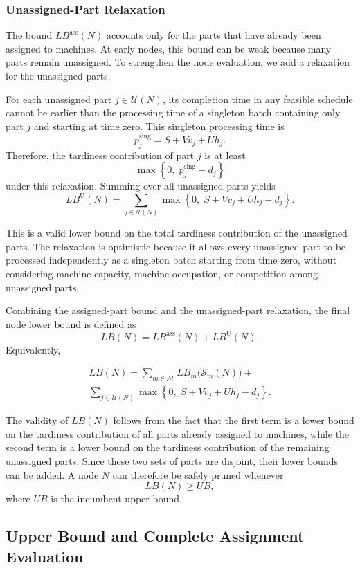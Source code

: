 \documentclass[letterpaper, 10 pt, conference]{ieeeconf}  %
\begin{document}
\subsubsection{Unassigned-Part Relaxation}

The bound $LB^{\mathrm{ass}}(N)$ accounts only for the parts that have
already been assigned to machines. At early nodes, this bound can be weak
because many parts remain unassigned. To strengthen the node evaluation, we
add a relaxation for the unassigned parts.

For each unassigned part $j\in\mathcal{U}(N)$, its completion time in any
feasible schedule cannot be earlier than the processing time of a singleton
batch containing only part $j$ and starting at time zero. This singleton
processing time is
\[
p_j^{\mathrm{sing}}
=
S+Vv_j+Uh_j.
\]
Therefore, the tardiness contribution of part $j$ is at least
\[
\max\left\{0,\;p_j^{\mathrm{sing}}-d_j\right\}
\]
under this relaxation. Summing over all unassigned parts yields
\[
LB^{\mathrm{U}}(N)
=
\sum_{j\in\mathcal{U}(N)}
\max\left\{0,\;S+Vv_j+Uh_j-d_j\right\}.
\]

This is a valid lower bound on the total tardiness contribution of the
unassigned parts. The relaxation is optimistic because it allows every
unassigned part to be processed independently as a singleton batch starting
from time zero, without considering machine capacity, machine occupation, or
competition among unassigned parts.

Combining the assigned-part bound and the unassigned-part relaxation, the
final node lower bound is defined as
\[
LB(N)
=
LB^{\mathrm{ass}}(N)
+
LB^{\mathrm{U}}(N).
\]
Equivalently,

\begin{align}
LB(N)
=
\sum_{m\in\mathcal{M}}
LB_m\bigl(\mathcal{S}_m(N)\bigr)
+ \\
\sum_{j\in\mathcal{U}(N)}
\max\left\{0,\;S+Vv_j+Uh_j-d_j\right\}.
\end{align}

The validity of $LB(N)$ follows from the fact that the first term is a lower
bound on the tardiness contribution of all parts already assigned to
machines, while the second term is a lower bound on the tardiness
contribution of the remaining unassigned parts. Since these two sets of
parts are disjoint, their lower bounds can be added. A node $N$ can
therefore be safely pruned whenever
\[
LB(N)\ge UB,
\]
where $UB$ is the incumbent upper bound.


\subsection{Upper Bound and Complete Assignment Evaluation}
\label{subsec:ub_complete_eval}
\end{document}
